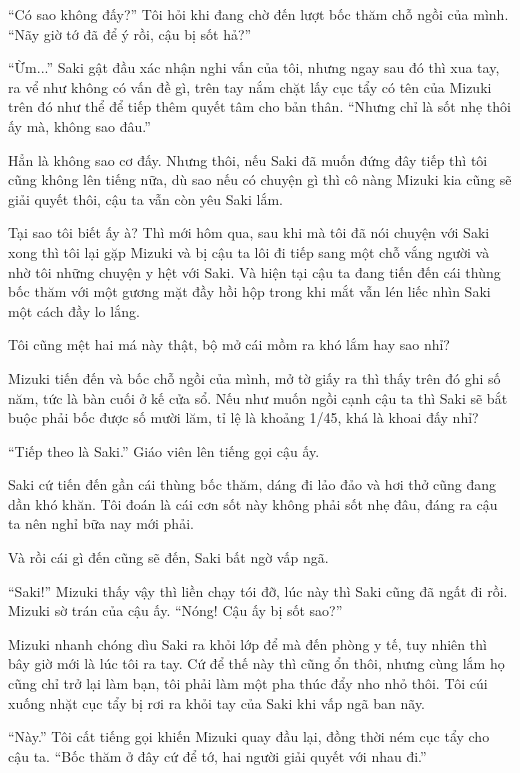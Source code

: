 {``Có sao không đấy?'' Tôi hỏi khi đang chờ đến lượt bốc thăm chỗ ngồi
của mình. ``Nãy giờ tớ đã để ý rồi, cậu bị sốt hả?''

``Ừm...'' Saki gật đầu xác nhận nghi vấn của tôi, nhưng ngay sau đó thì
xua tay, ra vể như không có vấn đề gì, trên tay nắm chặt lấy cục tẩy có
tên của Mizuki trên đó như thể để tiếp thêm quyết tâm cho bản thân.
``Nhưng chỉ là sốt nhẹ thôi ấy mà, không sao đâu.''

Hẳn là không sao cơ đấy. Nhưng thôi, nếu Saki đã muốn đứng đây tiếp thì
tôi cũng không lên tiếng nữa, dù sao nếu có chuyện gì thì cô nàng Mizuki
kia cũng sẽ giải quyết thôi, cậu ta vẫn còn yêu Saki lắm.

Tại sao tôi biết ấy à? Thì mới hôm qua, sau khi mà tôi đã nói chuyện với
Saki xong thì tôi lại gặp Mizuki và bị cậu ta lôi đi tiếp sang một chỗ
vắng người và nhờ tôi những chuyện y hệt với Saki. Và hiện tại cậu ta
đang tiến đến cái thùng bốc thăm với một gương mặt đầy hồi hộp trong khi
mắt vẫn lén liếc nhìn Saki một cách đầy lo lắng.

Tôi cũng mệt hai má này thật, bộ mở cái mồm ra khó lắm hay sao nhỉ?

Mizuki tiến đến và bốc chỗ ngồi của mình, mở tờ giấy ra thì thấy trên đó
ghi số năm, tức là bàn cuối ở kế cửa sổ. Nếu như muốn ngồi cạnh cậu ta
thì Saki sẽ bắt buộc phải bốc được số mười lăm, tỉ lệ là khoảng 1/45,
khá là khoai đấy nhỉ?

``Tiếp theo là Saki.'' Giáo viên lên tiếng gọi cậu ấy.

Saki cứ tiến đến gần cái thùng bốc thăm, dáng đi lảo đảo và hơi thở cũng
đang dần khó khăn. Tôi đoán là cái cơn sốt này không phải sốt nhẹ đâu,
đáng ra cậu ta nên nghỉ bữa nay mới phải.

Và rồi cái gì đến cũng sẽ đến, Saki bất ngờ vấp ngã.

``Saki!'' Mizuki thấy vậy thì liền chạy tói đỡ, lúc này thì Saki cũng đã
ngất đi rồi. Mizuki sờ trán của cậu ấy. ``Nóng! Cậu ấy bị sốt sao?''

Mizuki nhanh chóng dìu Saki ra khỏi lớp để mà đến phòng y tế, tuy nhiên
thì bây giờ mới là lúc tôi ra tay. Cứ để thế này thì cũng ổn thôi, nhưng
cùng lắm họ cũng chỉ trở lại làm bạn, tôi phải làm một pha thúc đẩy nho
nhỏ thôi. Tôi cúi xuống nhặt cục tẩy bị rơi ra khỏi tay của Saki khi vấp
ngã ban nãy.

``Này.'' Tôi cất tiếng gọi khiến Mizuki quay đầu lại, đồng thời ném cục
tẩy cho cậu ta. ``Bốc thăm ở đây cứ để tớ, hai người giải quyết với nhau
đi.''

}
